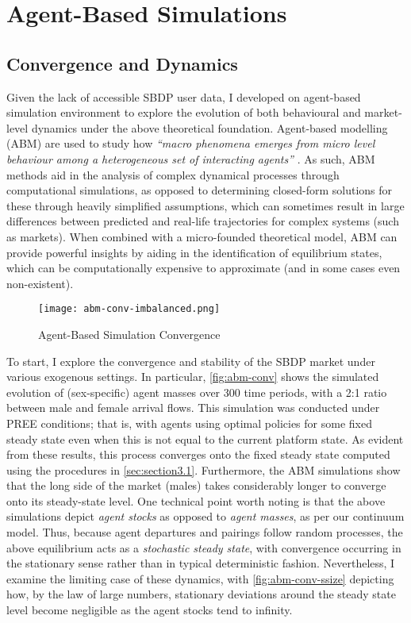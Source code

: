 \section{Agent-Based Simulations}
\label{sec:section4}  
\subsection{Convergence and Dynamics}
Given the lack of accessible SBDP user data, I developed on agent-based simulation environment to explore the evolution of both behavioural and market-level dynamics under the above theoretical foundation. Agent-based modelling (ABM) are used to study how \textit{``macro phenomena emerges from micro level behaviour among a heterogeneous set of interacting agents''} \citep{janssen2005agent}. As such, ABM methods aid in the analysis of complex dynamical processes through computational simulations, as opposed to determining closed-form solutions for these through heavily simplified assumptions, which can sometimes result in large differences between predicted and real-life trajectories for complex systems (such as markets).
When combined with a micro-founded theoretical model, ABM can provide powerful insights by aiding in the identification of equilibrium states, which can be computationally expensive to approximate (and in some cases even non-existent).

\begin{figure}[ht]
    \centering
    \caption{Agent-Based Simulation Convergence}
    \texttt{[image: abm-conv-imbalanced.png]}
    \label{fig:abm-conv} 
\end{figure}

To start, I explore the convergence and stability of the SBDP market under various exogenous settings. In particular, \autoref{fig:abm-conv} shows the simulated evolution of (sex-specific) agent masses over 300 time periods, with a 2:1 ratio between male and female arrival flows. This simulation was conducted under PREE conditions; that is, with agents using optimal policies for some fixed steady state even when this is not equal to the current platform state.  
As evident from these results, this process converges onto the fixed steady state computed using the procedures in \autoref{sec:section3.1}. Furthermore, the ABM simulations show that the long side of the market (males) takes considerably longer to converge onto its steady-state level. One technical point worth noting is that the above simulations depict \textit{agent stocks} as opposed to \textit{agent masses}, as per our continuum model. Thus, because agent departures and pairings follow random processes, the above equilibrium acts as a \textit{stochastic steady state}, with convergence occurring in the stationary sense rather than in typical deterministic fashion. Nevertheless, I examine the limiting case of these dynamics, with \autoref{fig:abm-conv-ssize} depicting how, by the law of large numbers, stationary deviations around the steady state level become negligible as the agent stocks tend to infinity. 

